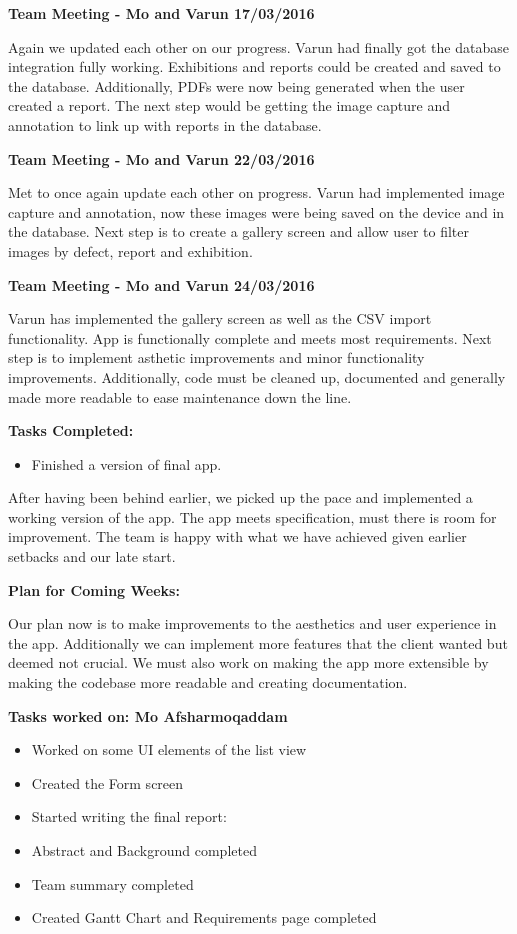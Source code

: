 \documentclass[12pt]{article}
\begin{document}
	\textbf{Team Meeting - Mo and Varun 17/03/2016}
\par
Again we updated each other on our progress. Varun had finally got the database integration fully working. Exhibitions and reports could be created and saved to the database. Additionally, PDFs were now being generated when the user created a report. The next step would be getting the image capture and annotation to link up with reports in the database.
\par
\bigskip	
	\textbf{Team Meeting - Mo and Varun 22/03/2016}
\par
	Met to once again update each other on progress. Varun had implemented image capture and annotation, now these images were being saved on the device and in the database. Next step is to create a gallery screen and allow user to filter images by defect, report and exhibition.
\par
\bigskip

	\textbf{Team Meeting - Mo and Varun 24/03/2016}
\par
	Varun has implemented the gallery screen as well as the CSV import functionality. App is functionally complete and meets most requirements. Next step is to implement asthetic improvements and minor functionality improvements. Additionally, code must be cleaned up, documented and generally made more readable to ease maintenance down the line. 
\par
\bigskip

\textbf{Tasks Completed:}
\begin{itemize}
\item Finished a version of final app.
\end{itemize}
\par
\bigskip
	 After having been behind earlier, we picked up the pace and implemented a working version of the app. The app meets specification, must there is room for improvement. The team is happy with what we have achieved given earlier setbacks and our late start. 
\par
\bigskip
\textbf{Plan for Coming Weeks:}
\par
	 Our plan now is to make improvements to the aesthetics and user experience in the app. Additionally we can implement more features that the client wanted but deemed not crucial. We must also work on making the app more extensible by making the codebase more readable and creating documentation. 
\par
\bigskip
	
\textbf{Tasks worked on: Mo Afsharmoqaddam}
\begin{itemize}
\item Worked on some UI elements of the list view
\item Created the Form screen
\item Started writing the final report:
\item Abstract and Background completed
\item Team summary completed
\item Created Gantt Chart and Requirements page completed
\end{itemize}
\bigskip
\end{document}
